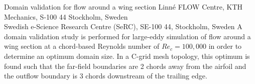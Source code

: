 %
\papertitle%
{%
 Domain validation for flow around a wing section%
}%
%
%
%
%
%
\paperaffiliation
{%
  Linn\'e FLOW Centre, KTH Mechanics, S-100 44 Stockholm, Sweden\\
  Swedish e-Science Research Centre (SeRC), SE-100 44, Stockholm, Sweden%
}%
%
%
%
%
%
%
%
%
%
%
\papersummary%
{%
	A domain validation study is performed for large-eddy simulation of flow around a wing section at a chord-based Reynolds number of $Re_{c}=100,000$ in order to determine an optimum domain size. In a C-grid mesh topology, this optimum is found such that the far-field boundaries are 2 chords away from the airfoil and the outflow boundary is 3 chords downstream of the trailing edge.
}%
%
\graphicspath{{validation/imgs/}}%
%
%
%
